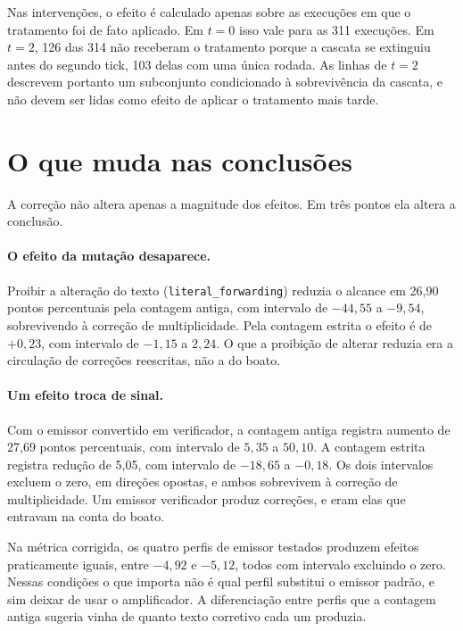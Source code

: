 Nas intervenções, o efeito é calculado apenas sobre as execuções em que o
tratamento foi de fato aplicado. Em $t=0$ isso vale para as 311 execuções. Em
$t=2$, 126 das 314 não receberam o tratamento porque a cascata se extinguiu
antes do segundo tick, 103 delas com uma única rodada. As linhas de $t=2$
descrevem portanto um subconjunto condicionado à sobrevivência da cascata, e
não devem ser lidas como efeito de aplicar o tratamento mais tarde.

\begin{table}[htbp]
\centering
\caption{Contrastes pareados por condição, nas duas métricas. Intervalos de
99,77\%, com correção de Bonferroni sobre as 22 condições.}
\label{tab:contrastes}
\footnotesize
\setlength{\tabcolsep}{4pt}

\end{table}

\section{O que muda nas conclusões}

A correção não altera apenas a magnitude dos efeitos. Em três pontos ela altera
a conclusão.

\paragraph{O efeito da mutação desaparece.} Proibir a alteração do texto
(\texttt{literal\_forwarding}) reduzia o alcance em 26,90 pontos percentuais
pela contagem antiga, com intervalo de $-44{,}55$ a $-9{,}54$, sobrevivendo à
correção de multiplicidade. Pela contagem estrita o efeito é de $+0{,}23$, com
intervalo de $-1{,}15$ a $2{,}24$. O que a proibição de alterar reduzia era a
circulação de correções reescritas, não a do boato.

\paragraph{Um efeito troca de sinal.} Com o emissor convertido em verificador,
a contagem antiga registra aumento de 27,69 pontos percentuais, com intervalo
de $5{,}35$ a $50{,}10$. A contagem estrita registra redução de 5,05, com
intervalo de $-18{,}65$ a $-0{,}18$. Os dois intervalos excluem o zero, em
direções opostas, e ambos sobrevivem à correção de multiplicidade. Um emissor
verificador produz correções, e eram elas que entravam na conta do boato.

Na métrica corrigida, os quatro perfis de emissor testados produzem efeitos
praticamente iguais, entre $-4{,}92$ e $-5{,}12$, todos com intervalo excluindo
o zero. Nessas condições o que importa não é qual perfil substitui o emissor
padrão, e sim deixar de usar o amplificador. A diferenciação entre perfis que a
contagem antiga sugeria vinha de quanto texto corretivo cada um produzia.

